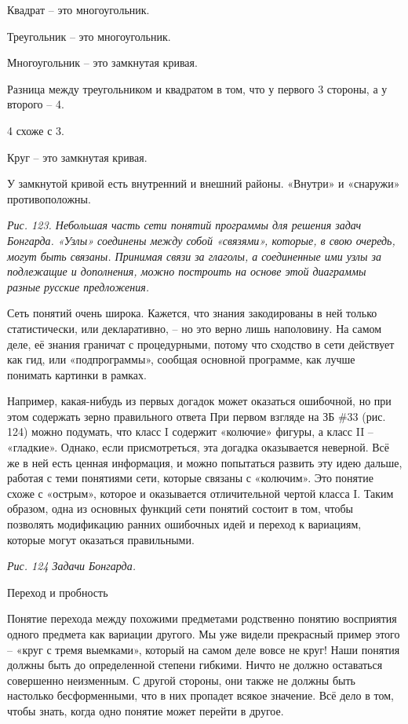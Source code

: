 \documentclass[../main.tex]{subfiles}
\begin{document}
Квадрат \--- это многоугольник.

Треугольник \--- это многоугольник.

Многоугольник \--- это замкнутая кривая.

Разница между треугольником и квадратом в том, что у первого 3 стороны, а у второго \--- 4.

4 схоже с 3.

Круг \--- это замкнутая кривая.

У замкнутой кривой есть внутренний и внешний районы. «Внутри» и «снаружи» противоположны.

\emph{Рис. 123. Небольшая часть сети понятий программы для решения задач Бонгарда. «Узлы» соединены между собой «связями», которые, в свою очередь, могут быть связаны. Принимая связи за глаголы, а соединенные ими узлы за подлежащие и дополнения, можно построить на основе этой диаграммы разные русские предложения.}

Сеть понятий очень широка. Кажется, что знания закодированы в ней только статистически, или декларативно, \--- но это верно лишь наполовину. На самом деле, её знания граничат с процедурными, потому что сходство в сети действует как гид, или «подпрограммы», сообщая основной программе, как лучше понимать картинки в рамках.

Например, какая-нибудь из первых догадок может оказаться ошибочной, но при этом содержать зерно правильного ответа При первом взгляде на ЗБ \#33 (рис. 124) можно подумать, что класс I содержит «колючие» фигуры, а класс II \--- «гладкие». Однако, если присмотреться, эта догадка оказывается неверной. Всё же в ней есть ценная информация, и можно попытаться развить эту идею дальше, работая с теми понятиями сети, которые связаны с «колючим». Это понятие схоже с «острым», которое и оказывается отличительной чертой класса I. Таким образом, одна из основных функций сети понятий состоит в том, чтобы позволять модификацию ранних ошибочных идей и переход к вариациям, которые могут оказаться правильными.

\emph{Рис. 124 Задачи Бонгарда.}

Переход и пробность

Понятие перехода между похожими предметами родственно понятию восприятия одного предмета как вариации другого. Мы уже видели прекрасный пример этого \--- «круг с тремя выемками», который на самом деле вовсе не круг! Наши понятия должны быть до определенной степени гибкими. Ничто не должно оставаться совершенно неизменным. С другой стороны, они также не должны быть настолько бесформенными, что в них пропадет всякое значение. Всё дело в том, чтобы знать, когда одно понятие может перейти в другое.
\end{document}
